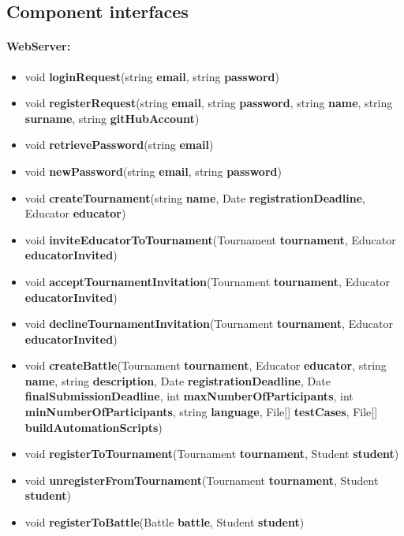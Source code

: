\documentclass{article}
\begin{document}
\newpage

\subsection{Component interfaces}

\paragraph{WebServer:}

\begin{itemize}
    \item void \textbf{loginRequest}(string \textbf{email}, string \textbf{password})
    \item void \textbf{registerRequest}(string \textbf{email}, string \textbf{password}, string \textbf{name}, string \textbf{surname}, string \textbf{gitHubAccount})
    \item void \textbf{retrievePassword}(string \textbf{email})
    \item void \textbf{newPassword}(string \textbf{email}, string \textbf{password})
    \item void \textbf{createTournament}(string \textbf{name}, Date \textbf{registrationDeadline}, Educator \textbf{educator})
    \item void \textbf{inviteEducatorToTournament}(Tournament \textbf{tournament}, Educator \textbf{educatorInvited})
    \item void \textbf{acceptTournamentInvitation}(Tournament \textbf{tournament}, 
    Educator \textbf{educatorInvited})
    \item void \textbf{declineTournamentInvitation}(Tournament \textbf{tournament},
    Educator \textbf{educatorInvited})
    \item void \textbf{createBattle}(Tournament \textbf{tournament}, Educator \textbf{educator}, string \textbf{name}, 
    string \textbf{description}, Date \textbf{registrationDeadline}, Date \textbf{finalSubmissionDeadline}, 
    int \textbf{maxNumberOfParticipants}, int \textbf{minNumberOfParticipants},
    string \textbf{language}, File[] \textbf{testCases}, File[] \textbf{buildAutomationScripts})
    \item void \textbf{registerToTournament}(Tournament \textbf{tournament}, Student \textbf{student})
    \item void \textbf{unregisterFromTournament}(Tournament \textbf{tournament}, Student \textbf{student})
    \item void \textbf{registerToBattle}(Battle \textbf{battle}, Student \textbf{student})

\end{itemize}
\end{document}
